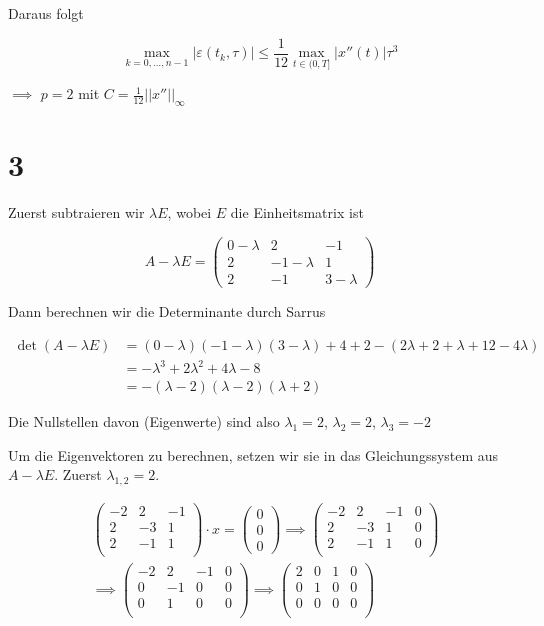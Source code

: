 \documentclass[ngerman,a4paper]{scrartcl}
\begin{document}
Daraus folgt

\[
\max_{k=0,\dots,n-1} |\varepsilon(t_k, \tau)| \leq \frac{1}{12} \max_{t \in (0, T]} | x''(t)| \tau^3
\]

$\implies$ $p=2$ mit $C = \frac{1}{12} ||x''||_\infty$

\section*{3}

Zuerst subtraieren wir $\lambda E$, wobei $E$ die Einheitsmatrix ist

\[
A - \lambda E =
\begin{pmatrix}
  0-\lambda & 2 & -1\\
  2 & -1-\lambda & 1\\
  2 & -1 & 3-\lambda
\end{pmatrix}
\]

Dann berechnen wir die Determinante durch Sarrus

\begin{align*}
  \det(A-\lambda E) &= (0-\lambda)(-1-\lambda)(3-\lambda) + 4 + 2 - (2\lambda + 2 + \lambda + 12 - 4\lambda)\\
  &= -\lambda^3 + 2\lambda^2 + 4\lambda - 8\\
  &= -(\lambda - 2)(\lambda - 2)(\lambda+2)
\end{align*}

Die Nullstellen davon (Eigenwerte) sind also $\lambda_1 = 2$, $\lambda_2 =
2$, $\lambda_3 = -2$

Um die Eigenvektoren zu berechnen, setzen wir sie in das
Gleichungssystem aus $A-\lambda E$. Zuerst $\lambda_{1,2} = 2$.

\begin{align*}
  &\begin{pmatrix}
    -2 & 2 & -1\\
    2 & -3 & 1\\
    2 & -1 & 1\\
  \end{pmatrix} \cdot x =
  \begin{pmatrix}
    0\\0\\0
  \end{pmatrix} \implies   \begin{pmatrix}
    -2 & 2 & -1 & 0\\
    2 & -3 & 1 & 0\\
    2 & -1 & 1 & 0\\
  \end{pmatrix}\\
  &\implies \begin{pmatrix}
    -2 & 2 & -1 & 0\\
    0 & -1 & 0 & 0\\
    0 & 1 & 0 & 0\\
  \end{pmatrix}
  \implies \begin{pmatrix}
    2 & 0 & 1 & 0\\
    0 & 1 & 0 & 0\\
    0 & 0 & 0 & 0\\
  \end{pmatrix}
\end{align*}
\end{document}
